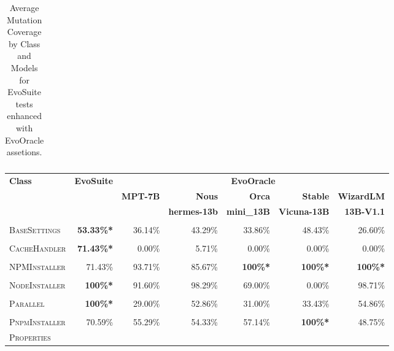\begin{table}[H]
\begin{tabular}{| l | r | r | r | r | r | r |}
\end{tabular}
\caption{Average Mutation Coverage by Class and Models for EvoSuite tests enhanced with EvoOracle assetions.\protect\footnotemark}
\label{tab:mutation_coverage}
\end{table}

\begin{table}[H]
\centering

\begin{tabular}{| l | r | r | r | r | r | r |}
\hline
\multirow{2}{*}{\textbf{Class}} & \multirow{2}{*}{\textbf{EvoSuite}} & \multicolumn{5}{c|}{\textbf{EvoOracle}} \\ %
\cline{3-7} %
 &  & \textbf{MPT-7B} & \textbf{Nous} & \textbf{Orca} & \textbf{Stable} & \textbf{WizardLM} \\
 &  &  & \textbf{hermes-13b} & \textbf{mini\_13B} & \textbf{Vicuna-13B} & \textbf{13B-V1.1} \\
\hline
\scriptsize\textsc{} &  &  &  &  &  &  \\
\scriptsize\textsc{BaseSettings} & \textbf{53.33\%*} & 36.14\% & 43.29\% & 33.86\% & 48.43\% & 26.60\% \\
\hline
\scriptsize\textsc{} &  &  &  &  &  &  \\
\scriptsize\textsc{CacheHandler} & \textbf{71.43\%*} & 0.00\% & 5.71\% & 0.00\% & 0.00\% & 0.00\% \\
\hline
\scriptsize\textsc{} &  &  &  &  &  &  \\
\scriptsize\textsc{NPMInstaller} & 71.43\% & 93.71\% & 85.67\% & \textbf{100\%*} & \textbf{100\%*} & \textbf{100\%*} \\
\hline
\scriptsize\textsc{} &  &  &  &  &  &  \\
\scriptsize\textsc{NodeInstaller} & \textbf{100\%*} & 91.60\% & 98.29\% & 69.00\% & 0.00\% & 98.71\% \\
\hline
\scriptsize\textsc{} &  &  &  &  &  &  \\
\scriptsize\textsc{Parallel} & \textbf{100\%*} & 29.00\% & 52.86\% & 31.00\% & 33.43\% & 54.86\% \\
\hline
\scriptsize\textsc{} &  &  &  &  &  &  \\
\scriptsize\textsc{PnpmInstaller} & 70.59\% & 55.29\% & 54.33\% & 57.14\% & \textbf{100\%*} & 48.75\% \\
\hline
\scriptsize\textsc{Properties} &  &  &  &  &  &  \\

\end{tabular}
\end{table}
